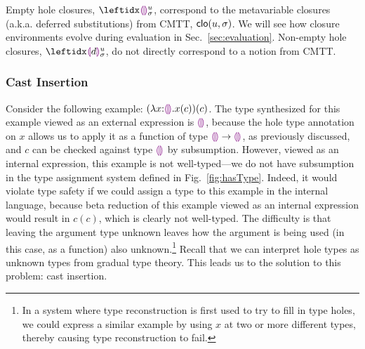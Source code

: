 Empty hole closures, $\dehole{u}{\sigma}{}$,  correspond to the metavariable closures (a.k.a. deferred substitutions) from CMTT, $\mathsf{clo}(u, \sigma)$. We will see how closure environments evolve during evaluation in Sec.~\ref{sec:evaluation}. Non-empty hole closures, $\dhole{d}{u}{\sigma}{}$, do not directly correspond to a notion from CMTT.

\subsubsection{Cast Insertion}\label{sec:cast-insertion} 
%
%
Consider the following example: $(\lambda x{:}\textcolor{violet}{\llparenthesis}\textcolor{violet}{\rrparenthesis}.x(c))(c)$. The type synthesized for this example viewed as an external expression is $\textcolor{violet}{\llparenthesis}\textcolor{violet}{\rrparenthesis}$, because the hole type annotation on $x$ allows us to apply it as a function of type $\textcolor{violet}{\llparenthesis}\textcolor{violet}{\rrparenthesis} \rightarrow \textcolor{violet}{\llparenthesis}\textcolor{violet}{\rrparenthesis}$, as previously discussed, and $c$ can be checked against type $\textcolor{violet}{\llparenthesis}\textcolor{violet}{\rrparenthesis}$ by subsumption. However, viewed as an internal expression, this example is not well-typed---we do not have subsumption in the type assignment system defined in Fig.~\ref{fig:hasType}. Indeed, it would violate type safety if we could assign a type to this example in the internal language, because beta reduction of this example viewed as an internal expression would result in $c(c)$, which is clearly not well-typed. The difficulty is that leaving the argument type unknown leaves how the argument is being used (in this case, as a function) also unknown.\footnote{In a system where type reconstruction is first used to try to fill in type holes, we could express a similar example by using $x$ at two or more different types, thereby causing type reconstruction to fail.
} Recall that we can interpret hole types as unknown types from gradual type theory. This leads us to the solution to this problem: cast insertion. 
%

